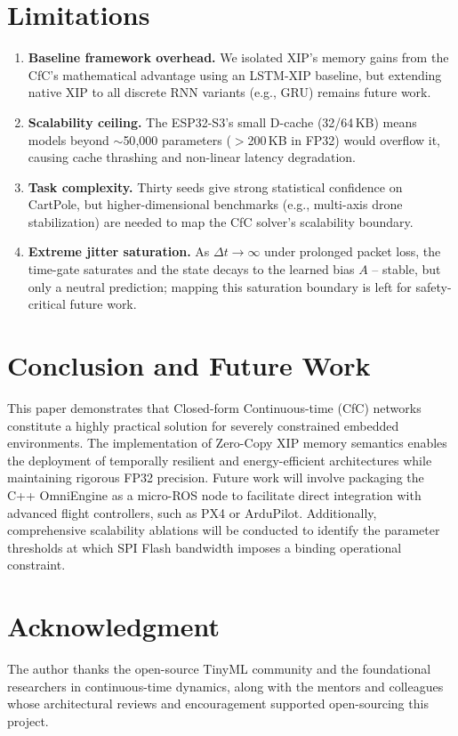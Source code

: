 \documentclass[conference]{IEEEtran}
\begin{document}
\section{Limitations}
\begin{enumerate}
\item \textbf{Baseline framework overhead.} We isolated XIP's memory gains from the CfC's mathematical advantage using an LSTM-XIP baseline, but extending native XIP to all discrete RNN variants (e.g., GRU) remains future work.
\item \textbf{Scalability ceiling.} The ESP32-S3's small D-cache (32/64\,KB) means models beyond $\sim$50{,}000 parameters ($>$200\,KB in FP32) would overflow it, causing cache thrashing and non-linear latency degradation.
\item \textbf{Task complexity.} Thirty seeds give strong statistical confidence on CartPole, but higher-dimensional benchmarks (e.g., multi-axis drone stabilization) are needed to map the CfC solver's scalability boundary.
\item \textbf{Extreme jitter saturation.} As $\Delta t \to \infty$ under prolonged packet loss, the time-gate saturates and the state decays to the learned bias $A$ -- stable, but only a neutral prediction; mapping this saturation boundary is left for safety-critical future work.
\end{enumerate}

\section{Conclusion and Future Work}
This paper demonstrates that Closed-form Continuous-time (CfC) networks constitute a highly practical solution for severely constrained embedded environments. The implementation of Zero-Copy XIP memory semantics enables the deployment of temporally resilient and energy-efficient architectures while maintaining rigorous FP32 precision. Future work will involve packaging the C++ OmniEngine as a micro-ROS node to facilitate direct integration with advanced flight controllers, such as PX4 or ArduPilot. Additionally, comprehensive scalability ablations will be conducted to identify the parameter thresholds at which SPI Flash bandwidth imposes a binding operational constraint.

\section*{Acknowledgment}
The author thanks the open-source TinyML community and the foundational researchers in continuous-time dynamics, along with the mentors and colleagues whose architectural reviews and encouragement supported open-sourcing this project.
\end{document}
